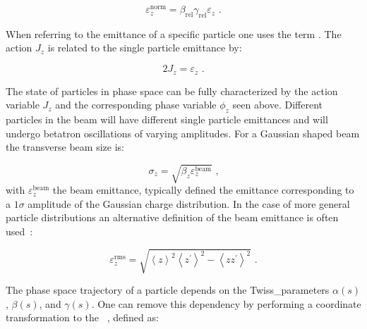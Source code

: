\begin{equation}
    \varepsilon_z^{\mathrm{norm}} = \beta_{\mathrm{rel}} \gamma_{\mathrm{rel}} \varepsilon_z \text{ .}
    \label{equation:normalized_emittance}
\end{equation}

When referring to the emittance of a specific particle one uses the term .
The \gls{action} \(J_z\) is related to the single particle emittance by:

\begin{equation}
    2 J_z = \varepsilon_z \text{ .}
    \label{equation:single_particle_action}
\end{equation}

The state of particles in phase space can be fully characterized by the action variable \(J_z\) and the corresponding phase variable \(\phi_z\) seen above. 
Different particles in the beam will have different single particle emittances and will undergo betatron oscillations of varying amplitudes.
For a Gaussian shaped beam the transverse beam size is:

\begin{equation}
    \sigma_z = \sqrt{\beta_z \varepsilon_z^{\mathrm{beam}}} \text{ ,}
    \label{equation:gaussian_beam_transverse_beam_size}
\end{equation}
with \(\varepsilon_z^{\mathrm{beam}}\) the beam emittance, typically defined the emittance corresponding to a \(1 \sigma\) amplitude of the Gaussian charge distribution.
In the case of more general particle distributions an alternative definition of the beam emittance is often used~\cite{CERN:Muller:Beam_Matter_Covariance_Matrix_Emittance, CERN:Buon:CAS_Beam_Phase_Space_Emittance}:

\begin{equation}
    \varepsilon_z^{\mathrm{rms}} = \sqrt{\left\langle z \right\rangle^{2} \left\langle z^{\prime} \right\rangle^{2} - \left\langle zz^{\prime} \right\rangle^{2}} \text{ .}
    \label{equation:beam_emittance_general}
\end{equation}

The phase space trajectory of a particle depends on the \gls{Twiss_parameters} \(\alpha(s)\), \(\beta(s)\), and \(\gamma(s)\).
One can remove this dependency by performing a coordinate transformation to the ~\cite{BOOK:Bazzani:Normal_Form_Approach_Betatron_Motion}, defined as:


